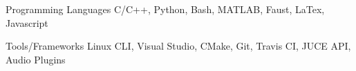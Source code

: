 

\begin{cvskills}

  \cvskill
    {Programming Languages} %
    {C/C++, Python, Bash, MATLAB, Faust, LaTex, Javascript} %

    \cvskill
    {Tools/Frameworks} %
    {Linux CLI, Visual Studio, CMake, Git, Travis CI, JUCE API, Audio Plugins} %


\end{cvskills}
